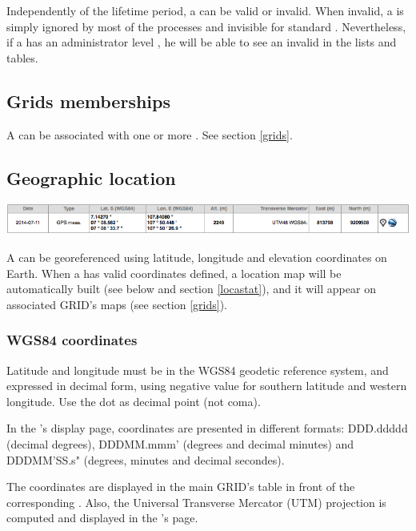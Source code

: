 Independently of the lifetime period, a  can be valid or invalid. When invalid, a  is simply ignored by most of the \webobs processes and invisible for standard . Nevertheless, if a  has an administrator level , he will be able to see an invalid  in the lists and tables.



\subsection{Grids memberships}

A  can be associated with one or more . See section \ref{grids}.

\subsection{Geographic location}

\includegraphics[width=\textwidth]{figures/NODE_location.png}

A  can be georeferenced using latitude, longitude and elevation coordinates on Earth. When a  has valid coordinates defined, a location map will be automatically built (see below and section \ref{locastat}), and it will appear on associated GRID's maps (see section \ref{grids}).

\subsubsection{WGS84 coordinates}

Latitude and longitude must be in the WGS84 geodetic reference system, and expressed in decimal form, using negative value for southern latitude and western longitude. Use the dot as decimal point (not coma).

In the 's display page, coordinates are presented in different formats: DDD.ddddd (decimal degrees), DDD\degree MM.mmm' (degrees and decimal minutes) and DDD\degree MM'SS.s" (degrees, minutes and decimal secondes).

The coordinates are displayed in the main GRID's table in front of the corresponding . Also, the Universal Transverse Mercator (UTM) projection is computed and displayed in the 's page.

